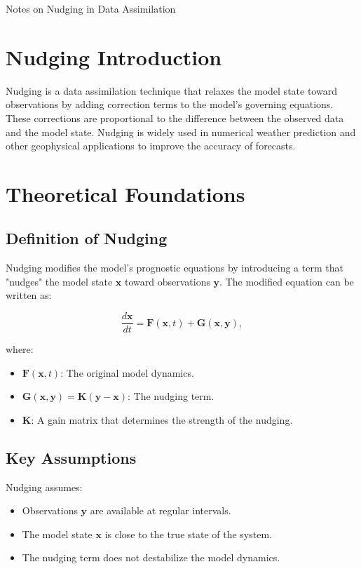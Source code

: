\documentclass[12pt,oneside]{article}
\theoremstyle{plain}
\begin{document}
\pagebreak


\begin{center}
    \LARGE Notes on Nudging in Data Assimilation \\
\end{center}

\section{Nudging Introduction}
Nudging is a data assimilation technique that relaxes the model state toward observations by adding correction terms to the model's governing equations. These corrections are proportional to the difference between the observed data and the model state. Nudging is widely used in numerical weather prediction and other geophysical applications to improve the accuracy of forecasts.

\section{Theoretical Foundations}
\subsection{Definition of Nudging}
Nudging modifies the model's prognostic equations by introducing a term that "nudges" the model state \( \mathbf{x} \) toward observations \( \mathbf{y} \). The modified equation can be written as:


\[
\frac{d\mathbf{x}}{dt} = \mathbf{F}(\mathbf{x}, t) + \mathbf{G}(\mathbf{x}, \mathbf{y}),
\]


where:
\begin{itemize}
    \item \( \mathbf{F}(\mathbf{x}, t) \): The original model dynamics.
    \item \( \mathbf{G}(\mathbf{x}, \mathbf{y}) = \mathbf{K} (\mathbf{y} - \mathbf{x}) \): The nudging term.
    \item \( \mathbf{K} \): A gain matrix that determines the strength of the nudging.
\end{itemize}

\subsection{Key Assumptions}
Nudging assumes:
\begin{itemize}
    \item Observations \( \mathbf{y} \) are available at regular intervals.
    \item The model state \( \mathbf{x} \) is close to the true state of the system.
    \item The nudging term does not destabilize the model dynamics.
\end{itemize}
\end{document}
